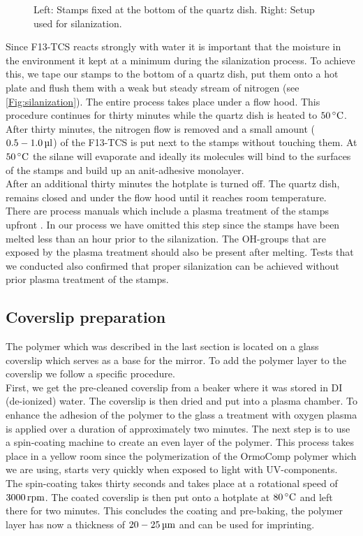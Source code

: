 \begin{figure}[H]
	\caption{Left: Stamps fixed at the bottom of the quartz dish. Right: Setup used for silanization.}
	\label{Fig:silanization}
\end{figure}
Since F13-TCS reacts strongly with water it is important that the moisture in the environment it kept at a minimum during the silanization process. To achieve this, we tape our stamps to the bottom of a quartz dish, put them onto a hot plate and flush them with a weak but steady stream of nitrogen (see \autoref{Fig:silanization}). The entire process takes place under a flow hood. This procedure continues for thirty minutes while the quartz dish is heated to $50\degrees$.\\
After thirty minutes, the nitrogen flow is removed and a small amount ($0.5-1.0\ul$) of the F13-TCS is put next to the stamps without touching them. At $50\degrees$ the silane will evaporate and ideally its molecules will bind to the surfaces of the stamps and build up an anit-adhesive monolayer.\\
After an additional thirty minutes the hotplate is turned off. The quartz dish, remains closed and under the flow hood until it reaches room temperature.\\
There are process manuals which include a plasma treatment of the stamps upfront \cite{park2004anti}. In our process we have omitted this step since the stamps have been melted less than an hour prior to the silanization. The OH-groups that are exposed by the plasma treatment should also be present after melting. Tests that 
we conducted also confirmed that proper silanization can be achieved without prior plasma treatment of the stamps.

\subsection{Coverslip preparation}\label{ChapCoverslipPreparation}
The polymer which was described in the last section is located on a glass coverslip which serves as a base for the mirror. To add the polymer layer to the coverslip we follow a specific procedure.\\
First, we get the pre-cleaned coverslip from a beaker where it was stored in DI (de-ionized) water. The coverslip is then dried and put into a plasma chamber. To enhance the adhesion of the polymer to the glass a treatment with oxygen plasma is applied over a duration of approximately two minutes. The next step is to use a spin-coating machine to create an even layer of the polymer. This process takes place in a yellow room since the polymerization of the OrmoComp polymer which we are using, starts very quickly when exposed to light with UV-components. The spin-coating takes thirty seconds and takes place at a rotational speed of $3000\rpm$. The coated coverslip is then put onto a hotplate at $80\degrees$ and left there for two minutes. This concludes the coating and pre-baking, the polymer layer has now a thickness of $20-25\um$ and can be used for imprinting.

